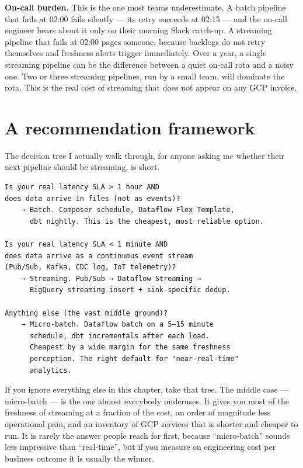 \documentclass[
  11pt,
  british,
  oneside]{book}
\begin{document}
\textbf{On-call burden.} This is the one most teams underestimate. A
batch pipeline that fails at 02:00 fails silently --- its retry succeeds
at 02:15 --- and the on-call engineer hears about it only on their
morning Slack catch-up. A streaming pipeline that fails at 02:00 pages
someone, because backlogs do not retry themselves and freshness alerts
trigger immediately. Over a year, a single streaming pipeline can be the
difference between a quiet on-call rota and a noisy one. Two or three
streaming pipelines, run by a small team, will dominate the rota. This
is the real cost of streaming that does not appear on any GCP invoice.

\hypertarget{a-recommendation-framework}{%
\section{A recommendation framework}\label{a-recommendation-framework}}

The decision tree I actually walk through, for anyone asking me whether
their next pipeline should be streaming, is short.

\begin{verbatim}
Is your real latency SLA > 1 hour AND
does data arrive in files (not as events)?
    → Batch. Composer schedule, Dataflow Flex Template,
      dbt nightly. This is the cheapest, most reliable option.

Is your real latency SLA < 1 minute AND
does data arrive as a continuous event stream
(Pub/Sub, Kafka, CDC log, IoT telemetry)?
    → Streaming. Pub/Sub → Dataflow Streaming →
      BigQuery streaming insert + sink-specific dedup.

Anything else (the vast middle ground)?
    → Micro-batch. Dataflow batch on a 5–15 minute
      schedule, dbt incrementals after each load.
      Cheapest by a wide margin for the same freshness
      perception. The right default for "near-real-time"
      analytics.
\end{verbatim}

If you ignore everything else in this chapter, take that tree. The
middle case --- micro-batch --- is the one almost everybody underuses.
It gives you most of the freshness of streaming at a fraction of the
cost, an order of magnitude less operational pain, and an inventory of
GCP services that is shorter and cheaper to run. It is rarely the answer
people reach for first, because ``micro-batch'' sounds less impressive
than ``real-time'', but if you measure on engineering cost per business
outcome it is usually the winner.
\end{document}
